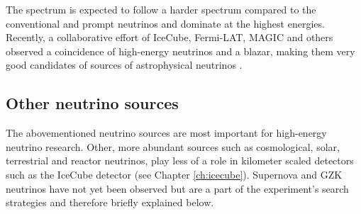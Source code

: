 The spectrum is expected to follow a harder spectrum compared to the conventional and prompt neutrinos and dominate at the highest energies.\\

\noindent Recently, a collaborative effort of IceCube, Fermi-LAT, MAGIC and others observed a coincidence of high-energy neutrinos and a blazar, making them very good candidates of sources of astrophysical neutrinos \cite{IceCube:2018dnn}.

\subsection{Other neutrino sources}
The abovementioned neutrino sources are most important for high-energy neutrino research. Other, more abundant sources such as cosmological, solar, terrestrial and reactor neutrinos, play less of a role in kilometer scaled detectors such as the IceCube detector (see Chapter \ref{ch:icecube}). Supernova and GZK neutrinos have not yet been observed but are a part of the experiment's search strategies and therefore briefly explained below.

 


